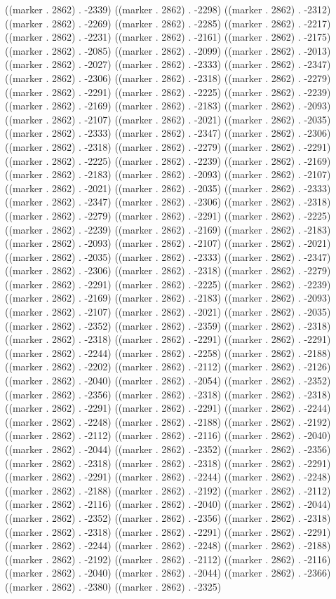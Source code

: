 ((marker . 2862) . -2339) ((marker . 2862) . -2298) ((marker . 2862) . -2312) ((marker . 2862) . -2269) ((marker . 2862) . -2285) ((marker . 2862) . -2217) ((marker . 2862) . -2231) ((marker . 2862) . -2161) ((marker . 2862) . -2175) ((marker . 2862) . -2085) ((marker . 2862) . -2099) ((marker . 2862) . -2013) ((marker . 2862) . -2027) ((marker . 2862) . -2333) ((marker . 2862) . -2347) ((marker . 2862) . -2306) ((marker . 2862) . -2318) ((marker . 2862) . -2279) ((marker . 2862) . -2291) ((marker . 2862) . -2225) ((marker . 2862) . -2239) ((marker . 2862) . -2169) ((marker . 2862) . -2183) ((marker . 2862) . -2093) ((marker . 2862) . -2107) ((marker . 2862) . -2021) ((marker . 2862) . -2035) ((marker . 2862) . -2333) ((marker . 2862) . -2347) ((marker . 2862) . -2306) ((marker . 2862) . -2318) ((marker . 2862) . -2279) ((marker . 2862) . -2291) ((marker . 2862) . -2225) ((marker . 2862) . -2239) ((marker . 2862) . -2169) ((marker . 2862) . -2183) ((marker . 2862) . -2093) ((marker . 2862) . -2107) ((marker . 2862) . -2021) ((marker . 2862) . -2035) ((marker . 2862) . -2333) ((marker . 2862) . -2347) ((marker . 2862) . -2306) ((marker . 2862) . -2318) ((marker . 2862) . -2279) ((marker . 2862) . -2291) ((marker . 2862) . -2225) ((marker . 2862) . -2239) ((marker . 2862) . -2169) ((marker . 2862) . -2183) ((marker . 2862) . -2093) ((marker . 2862) . -2107) ((marker . 2862) . -2021) ((marker . 2862) . -2035) ((marker . 2862) . -2333) ((marker . 2862) . -2347) ((marker . 2862) . -2306) ((marker . 2862) . -2318) ((marker . 2862) . -2279) ((marker . 2862) . -2291) ((marker . 2862) . -2225) ((marker . 2862) . -2239) ((marker . 2862) . -2169) ((marker . 2862) . -2183) ((marker . 2862) . -2093) ((marker . 2862) . -2107) ((marker . 2862) . -2021) ((marker . 2862) . -2035) ((marker . 2862) . -2352) ((marker . 2862) . -2359) ((marker . 2862) . -2318) ((marker . 2862) . -2318) ((marker . 2862) . -2291) ((marker . 2862) . -2291) ((marker . 2862) . -2244) ((marker . 2862) . -2258) ((marker . 2862) . -2188) ((marker . 2862) . -2202) ((marker . 2862) . -2112) ((marker . 2862) . -2126) ((marker . 2862) . -2040) ((marker . 2862) . -2054) ((marker . 2862) . -2352) ((marker . 2862) . -2356) ((marker . 2862) . -2318) ((marker . 2862) . -2318) ((marker . 2862) . -2291) ((marker . 2862) . -2291) ((marker . 2862) . -2244) ((marker . 2862) . -2248) ((marker . 2862) . -2188) ((marker . 2862) . -2192) ((marker . 2862) . -2112) ((marker . 2862) . -2116) ((marker . 2862) . -2040) ((marker . 2862) . -2044) ((marker . 2862) . -2352) ((marker . 2862) . -2356) ((marker . 2862) . -2318) ((marker . 2862) . -2318) ((marker . 2862) . -2291) ((marker . 2862) . -2291) ((marker . 2862) . -2244) ((marker . 2862) . -2248) ((marker . 2862) . -2188) ((marker . 2862) . -2192) ((marker . 2862) . -2112) ((marker . 2862) . -2116) ((marker . 2862) . -2040) ((marker . 2862) . -2044) ((marker . 2862) . -2352) ((marker . 2862) . -2356) ((marker . 2862) . -2318) ((marker . 2862) . -2318) ((marker . 2862) . -2291) ((marker . 2862) . -2291) ((marker . 2862) . -2244) ((marker . 2862) . -2248) ((marker . 2862) . -2188) ((marker . 2862) . -2192) ((marker . 2862) . -2112) ((marker . 2862) . -2116) ((marker . 2862) . -2040) ((marker . 2862) . -2044) ((marker . 2862) . -2366) ((marker . 2862) . -2380) ((marker . 2862) . -2325) 